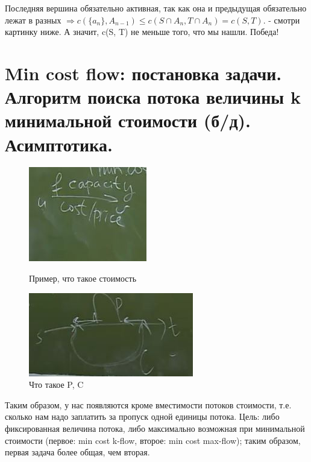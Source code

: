 Последняя вершина обязательно активная, так как она и предыдущая обязательно лежат в разных $\Rightarrow c(\{a_n\}, A_{n-1}) \leqslant c(S \cap A_n, T \cap A_n) = c(S, T)$.  - смотри картинку ниже. А значит, c(S, T) не меньше того, что мы нашли. Победа!

\begin{figure}[h]
\end{figure}


\setcounter{section}{87}
\section{Min cost flow: постановка задачи. Алгоритм поиска потока величины k минимальной стоимости (б/д). Асимптотика.}

\begin{figure}[!htb]
   \begin{minipage}{.5\textwidth}
     \centering
     \includegraphics[height = 2 cm]{images/87-92_min-cost}
     \caption{Пример, что такое стоимость}
   \end{minipage}\hfill
    \begin{minipage}{.5\textwidth}
     \centering
     \includegraphics[height = 2 cm]{images/87-92_90_min}
     \caption{Что такое P, C}
   \end{minipage}
\end{figure}


Таким образом, у нас появляются кроме вместимости потоков стоимости, т.е. сколько нам надо заплатить за пропуск одной единицы потока. Цель: либо фиксированная величина потока, либо максимально возможная при минимальной стоимости (первое: min cost k-flow, второе: min cost max-flow); таким образом, первая задача более общая, чем вторая.

